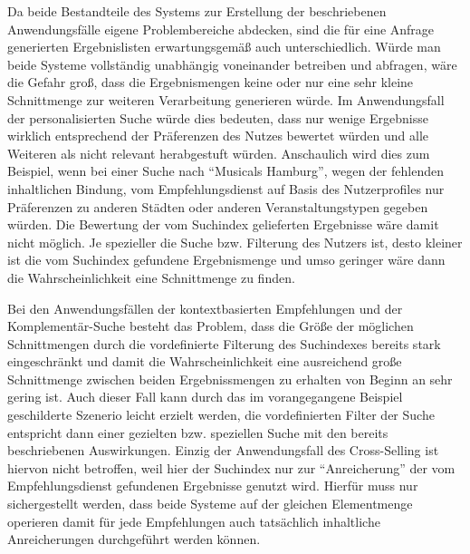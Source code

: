Da beide Bestandteile des Systems zur Erstellung der beschriebenen Anwendungsfälle eigene Problembereiche abdecken, sind die für eine Anfrage generierten Ergebnislisten erwartungsgemäß auch unterschiedlich. Würde man beide Systeme vollständig unabhängig voneinander betreiben und abfragen, wäre die Gefahr groß, dass die Ergebnismengen keine oder nur eine sehr kleine Schnittmenge zur weiteren Verarbeitung generieren würde. Im Anwendungsfall der personalisierten Suche würde dies bedeuten, dass nur wenige Ergebnisse wirklich entsprechend der Präferenzen des Nutzes bewertet würden und alle Weiteren als nicht relevant herabgestuft würden. Anschaulich wird dies zum Beispiel, wenn bei einer Suche nach ``Musicals Hamburg'', wegen der fehlenden inhaltlichen Bindung, vom Empfehlungsdienst auf Basis des Nutzerprofiles nur Präferenzen zu anderen Städten oder anderen Veranstaltungstypen gegeben würden. Die Bewertung der vom Suchindex gelieferten Ergebnisse wäre damit nicht möglich. Je spezieller die Suche bzw. Filterung des Nutzers ist, desto kleiner ist die vom Suchindex gefundene Ergebnismenge und umso geringer wäre dann die Wahrscheinlichkeit eine Schnittmenge zu finden.

Bei den Anwendungsfällen der kontextbasierten Empfehlungen und der Komplementär-Suche besteht das Problem, dass die Größe der möglichen Schnittmengen durch die vordefinierte Filterung des Suchindexes bereits stark eingeschränkt und damit die Wahrscheinlichkeit eine ausreichend große Schnittmenge zwischen beiden Ergebnissmengen zu erhalten von Beginn an sehr gering ist. Auch dieser Fall kann durch das im vorangegangene Beispiel geschilderte Szenerio leicht erzielt werden, die vordefinierten Filter der Suche entspricht dann einer gezielten bzw. speziellen Suche mit den bereits beschriebenen Auswirkungen. Einzig der Anwendungsfall des Cross-Selling ist hiervon nicht betroffen, weil hier der Suchindex nur zur ``Anreicherung'' der vom Empfehlungsdienst gefundenen Ergebnisse genutzt wird. Hierfür muss nur sichergestellt werden, dass beide Systeme auf der gleichen Elementmenge operieren damit für jede Empfehlungen auch tatsächlich inhaltliche Anreicherungen durchgeführt werden können.


